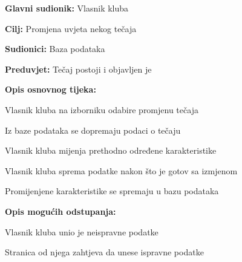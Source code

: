 					\noindent {}
					\begin{packed_item}
	
						\item \textbf{Glavni sudionik: }Vlasnik kluba
						\item  \textbf{Cilj:} Promjena uvjeta nekog tečaja
						\item  \textbf{Sudionici:} Baza podataka
						\item  \textbf{Preduvjet:} Tečaj postoji i objavljen je
						\item  \textbf{Opis osnovnog tijeka:}
						
						\item[] \begin{packed_enum}
	
							\item Vlasnik kluba na izborniku odabire promjenu tečaja
							\item Iz baze podataka se dopremaju podaci o tečaju
							\item Vlasnik kluba mijenja prethodno određene karakteristike
							\item Vlasnik kluba sprema podatke nakon što je gotov sa izmjenom
							\item Promijenjene karakteristike se spremaju u bazu podataka
						\end{packed_enum}
						
						\item  \textbf{Opis mogućih odstupanja:}
						
						\item[] \begin{packed_item}
	
							\item[2.a] Vlasnik kluba unio je neispravne podatke
							\item[] \begin{packed_enum}
								
								\item Stranica od njega zahtjeva da unese ispravne podatke
								
							\end{packed_enum}
						\end{packed_item}
					\end{packed_item}

